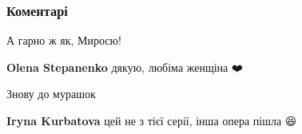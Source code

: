  
 
 
 
 
\subsubsection{Коментарі}

\begin{itemize}
 
А гарно ж як, Миросю!

\begin{itemize}
 
\textbf{Olena Stepanenko} дякую, любіма женщіна ❤️
\end{itemize}

 
Знову до мурашок👏👏👏

\begin{itemize}
 
\textbf{Iryna Kurbatova} цей не з тієї серії, інша опера пішла 😆

 

\end{itemize}
\end{itemize}
